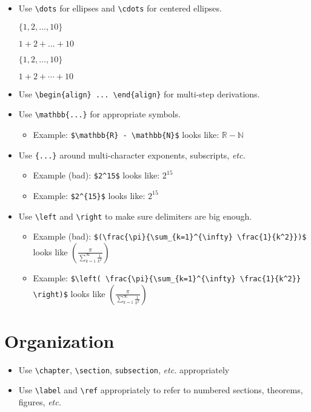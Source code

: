 \documentclass{article}
\begin{document}
\begin{itemize}
\item Use \verb|\dots| for ellipses and \verb|\cdots| for centered ellipses.
  \begin{bad}
$\{1, 2, ..., 10\}$
  \end{bad}
  \begin{bad}
$1 + 2 + ... + 10$
  \end{bad}
  \begin{good}
$\{1, 2, \dots, 10\}$
  \end{good}
  \begin{good}
$1 + 2 + \cdots + 10$
  \end{good}
\item Use \verb|\begin{align} ... \end{align}| for multi-step
  derivations.
\item Use \verb|\mathbb{...}| for appropriate symbols.
  \begin{itemize}
  \item Example: \verb|$\mathbb{R} - \mathbb{N}$| looks like: $\mathbb{R} - \mathbb{N}$
  \end{itemize}
\item Use \verb|{...}| around multi-character exponents, subscripts, \emph{etc.}
  \begin{itemize}
  \item Example (bad): \verb|$2^15$| looks like: $2^15$
  \item Example: \verb|$2^{15}$| looks like: $2^{15}$
  \end{itemize}
\item Use \verb|\left| and \verb|\right| to make sure delimiters are
  big enough.
  \begin{itemize}
  \item Example (bad): %
    \verb|$(\frac{\pi}{\sum_{k=1}^{\infty} \frac{1}{k^2}})$| looks
    like $(\frac{\pi}{\sum_{k=1}^{\infty} \frac{1}{k^2}})$
  \item Example: %
    \verb|$\left( \frac{\pi}{\sum_{k=1}^{\infty} \frac{1}{k^2}} \right)$| looks
    like $\left(\frac{\pi}{\sum_{k=1}^{\infty} \frac{1}{k^2}}\right)$
  \end{itemize}
\end{itemize}

\section*{Organization}

\begin{itemize}
\item Use \verb|\chapter|, \verb|\section|, \verb|subsection|,
  \emph{etc.} appropriately
\item Use \verb|\label| and \verb|\ref| appropriately to refer to
  numbered sections, theorems, figures, \emph{etc.}
\end{itemize}
\end{document}
